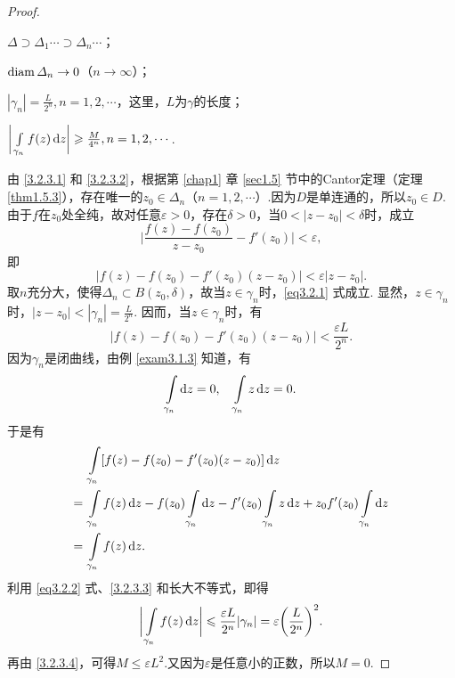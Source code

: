 \begin{proof}
  \begin{eenum}
    \item \label{3.2.3.1}$\varDelta\supset\varDelta_1\cdots\supset\varDelta_n\cdots$；
    \item \label{3.2.3.2} $\operatorname{diam}\varDelta_n\to0$（$n\to\infty$）；
    \item \label{3.2.3.3}$|\gamma_n|=\frac{L}{2^n},n=1,2,\cdots$，这里，$L$为$\gamma$的长度；
    \item \label{3.2.3.4}$\bigg|\int\limits_{\gamma_n}f(z)\mathop{}\!\mathrm dz\bigg|\geqslant\frac M{4^n},n=1,2,\cdots$.
  \end{eenum}

  由 \ref{3.2.3.1} 和 \ref{3.2.3.2}，根据第 \ref{chap1} 章 \ref{sec1.5} 节中的Cantor定理（定理 \ref{thm1.5.3}），存在唯一的$z_0\in\varDelta_n$（$n=1,2,\cdots$）.因为$D$是单连通的，所以$z_0\in D$. 由于$f$在$z_0$处全纯，故对任意$\varepsilon>0$，存在$\delta>0$，当$0<|z-z_0|<\delta$时，成立
  \begin{equation*}
    \bigg|\frac{f(z)-f(z_0)}{z-z_0}-f'(z_0)\bigg|<\varepsilon,
  \end{equation*}
  即
  \begin{equation}\label{eq3.2.1}
    |f(z)-f(z_0) - f'(z_0)(z-z_0)| < \varepsilon |z-z_0|.
  \end{equation}
  取$n$充分大，使得$\varDelta_n\subset B(z_0,\delta)$，故当$z\in\gamma_n$时，\eqref{eq3.2.1} 式成立. 显然，$z\in\gamma_n$时，$|z-z_0|<|\gamma_n|=\frac L{2^n}$. 因而，当$z\in\gamma_n$时，有
  \begin{equation}\label{eq3.2.2}
    |f(z)-f(z_0)-f'(z_0)(z-z_0)| < \frac{\varepsilon L}{2^n}.
  \end{equation}
  因为$\gamma_n$是闭曲线，由例 \ref{exam3.1.3} 知道，有
  \[
    \int\limits_{\gamma_n}\mathop{}\!\mathrm dz = 0, \quad\int\limits_{\gamma_n}z\mathop{}\!\mathrm dz = 0.
  \]
  于是有
  \begin{align*}
    & \int\limits_{\gamma_n}[f(z)-f(z_0)-f'(z_0)(z-z_0)]\mathop{}\!\mathrm dz\\
    = {}& \int\limits_{\gamma_n}f(z)\mathop{}\!\mathrm dz-f(z_0)\int\limits_{\gamma_n}\mathop{}\!\mathrm dz
    - f'(z_0)\int\limits_{\gamma_n}z\mathop{}\!\mathrm dz+z_0f'(z_0)\int\limits_{\gamma_n}\mathop{}\!\mathrm dz\\
    = {}& \int\limits_{\gamma_n}f(z)\mathop{}\!\mathrm dz.
  \end{align*}
  利用 \eqref{eq3.2.2} 式、\ref{3.2.3.3} 和长大不等式，即得
  \[
    \bigg|\int\limits_{\gamma_n}f(z)\mathop{}\!\mathrm dz\bigg|\leqslant\frac{\varepsilon L}{2^n}|\gamma_n|
    = \varepsilon\bigg(\frac{L}{2^n}\bigg)^2.
  \]
  再由 \ref{3.2.3.4}，可得$M\le\varepsilon L^2$.又因为$\varepsilon$是任意小的正数，所以$M=0$.


\end{proof}
